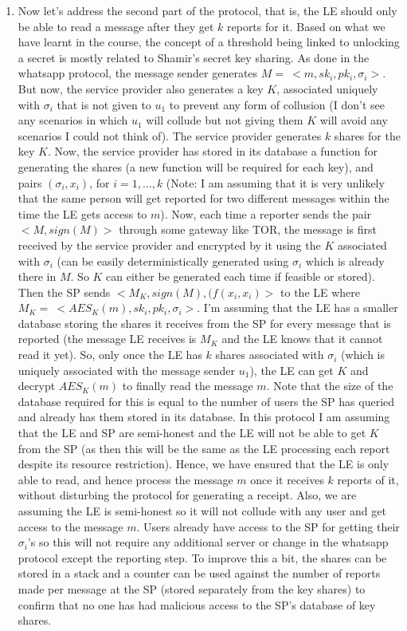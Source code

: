 \documentclass{ashoka-crypto}
\begin{document}
\begin{enumerate}
\item Now let's address the second part of the protocol, that is, the LE should only be able to read a message after they get $k$ reports for it. Based on what we have learnt in the course, the concept of a threshold being linked to unlocking a secret is mostly related to Shamir's secret key sharing. As done in the whatsapp protocol, the message sender generates $M = \> <m,sk_{i},pk_i,\sigma_i>$. But now, the service provider also generates a key $K$, associated uniquely with $\sigma_i$ that is not given to $u_1$ to prevent any form of collusion (I don't see any scenarios in which $u_1$ will collude but not giving them $K$ will avoid any scenarios I could not think of). The service provider generates $k$ shares for the key $K$. Now, the service provider has stored in its database a function for generating the shares (a new function will be required for each key), and pairs $(\sigma_i,x_i)$, for $i = 1,\dots, k$ (Note: I am assuming that it is very unlikely that the same person will get reported for two different messages within the time the LE gets access to $m$). Now, each time a reporter sends the pair $<M,sign(M)>$ through some gateway like TOR, the message is first received by the service provider and encrypted by it using the $K$ associated with $\sigma_i$ (can be easily deterministically generated using $\sigma_i$ which is already there in $M$. So $K$ can either be generated each time if feasible or stored). Then the SP sends $<M_K,sign(M),(f(x_i,x_i)>$ to the LE where $M_K = \> <AES_K(m),sk_{i},pk_{i},\sigma_i>$. I'm assuming that the LE has a smaller database storing the shares it receives from the SP for every message that is reported (the message LE receives is $M_K$ and the LE knows that it cannot read it yet). So, only once the LE has $k$ shares associated with $\sigma_i$ (which is uniquely associated with the message sender $u_1$), the LE can get $K$ and decrypt $AES_K(m)$ to finally read the message $m$. Note that the size of the database required for this is equal to the number of users the SP has queried and already has them stored in its database. In this protocol I am assuming that the LE and SP are semi-honest and the LE will not be able to get $K$ from the SP (as then this will be the same as the LE processing each report despite its resource restriction). Hence, we have ensured that the LE is only able to read, and hence process the message $m$ once it receives $k$ reports of it, without disturbing the protocol for generating a receipt. Also, we are assuming the LE is semi-honest so it will not collude with any user and get access to the message $m$. Users already have access to the SP for getting their $\sigma_i$'s so this will not require any additional server or change in the whatsapp protocol except the reporting step. To improve this a bit, the shares can be stored in a stack and a counter can be used against the number of reports made per message at the SP (stored separately from the key shares) to confirm that no one has had malicious access to the SP's database of key shares.


\end{enumerate}
\end{document}
